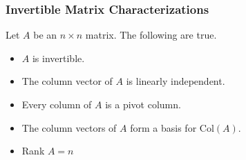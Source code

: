         \subsubsection{Invertible Matrix Characterizations}
        Let $A$ be an $n \times n$ matrix. The following are true.
        \begin{itemize}
            \item $A$ is invertible.
            \item The column vector of $A$ is linearly independent.
            \item Every column of $A$ is a pivot column.
            \item The column vectors of $A$ form a basis for Col$(A)$.
            \item Rank $A = n$
        \end{itemize}
